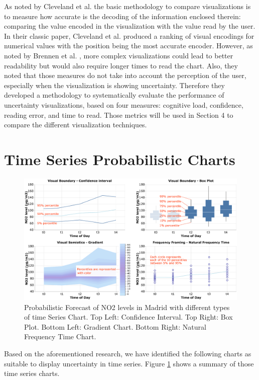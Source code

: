 \documentclass[a4paper,3p,sort&compress]{elsarticle}
\begin{document}
As noted by Cleveland et al. \cite{cleveland_graphical_1984} the basic
methodology to compare visualizations is to measure how accurate is the decoding
of the information enclosed therein: comparing the value encoded in the
visualization with the value read by the user. In their classic paper, Cleveland
et al. \cite{cleveland_graphical_1984} produced a ranking of visual encodings
for numerical values with the position being the most accurate encoder. However,
as noted by Brennen et al. \cite{brennen_instrument_2018}, more complex
visualizations could lead to better readability but would also require longer
times to read the chart. Also, they noted that those measures do not take into
account the perception of the user, especially when the visualization is showing
uncertainty. Therefore they developed a methodology to systematically evaluate
the performance of uncertainty visualizations, based on four measures: cognitive
load, confidence, reading error, and time to read. Those metrics will be used in
Section 4 to compare the different visualization techniques.

\section{Time Series Probabilistic Charts}
\label{sec:time_series}

\begin{figure}
  \centering
  \includegraphics[width=.9\textwidth]{charts_vector}
  \caption{\label{figure:charts} Probabilistic Forecast of NO2 levels in Madrid
    with different types of time Series Chart. Top Left: Confidence Interval.
    Top Right: Box Plot. Bottom Left: Gradient Chart. Bottom Right: Natural
    Frequency Time Chart.}
\end{figure}

Based on the aforementioned research, we have identified the following charts as
suitable to display uncertainty in time series. Figure \ref{figure:charts} shows
a summary of those time series charts.
\end{document}
